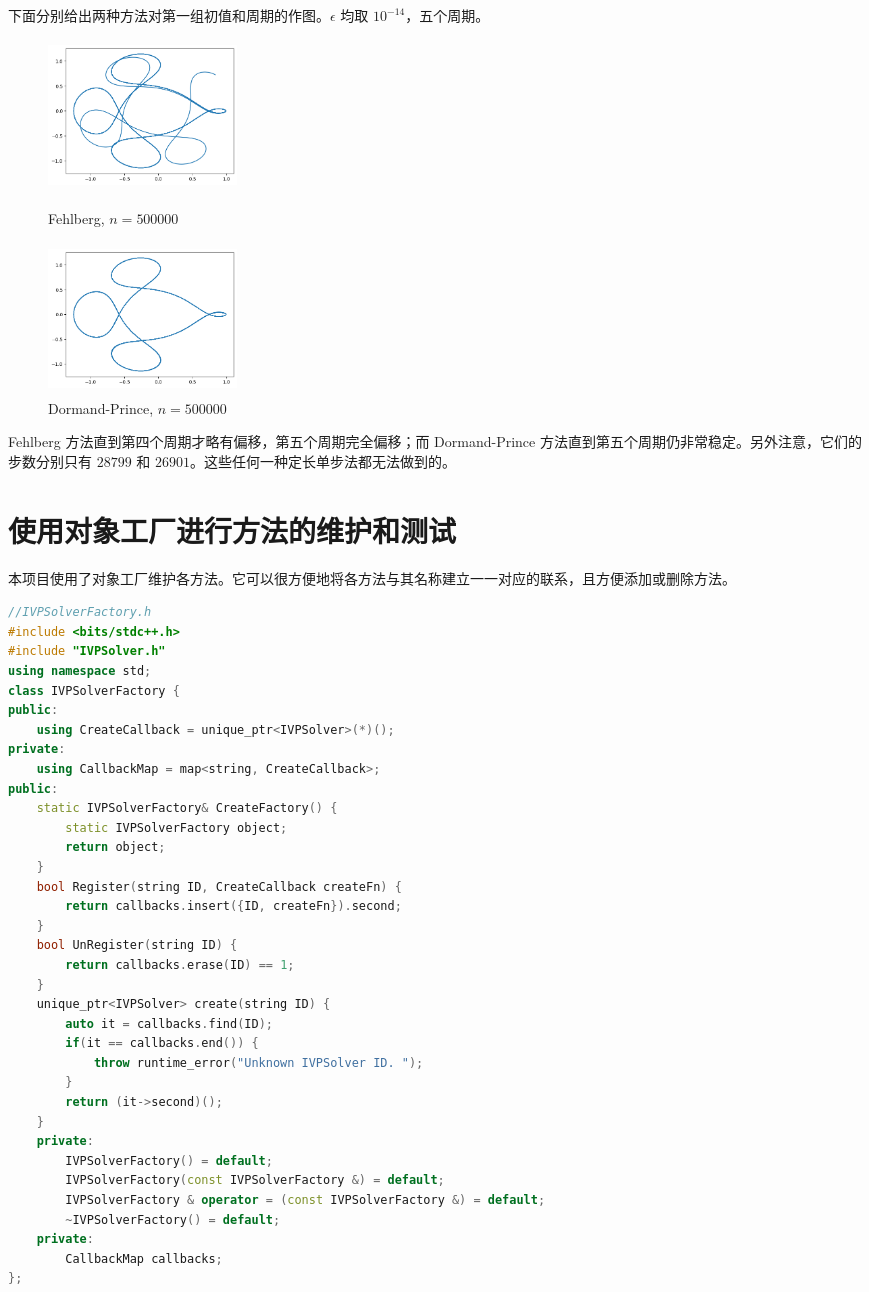 \documentclass{ctexart}
\begin{document}
下面分别给出两种方法对第一组初值和周期的作图。$\epsilon$ 均取 $10^{-14}$，五个周期。

\begin{figure}[htbp]
	\centering
	\begin{minipage}{5cm}
		\centering
		\includegraphics[width = 5cm, height = 4cm]{31.png}
		\caption{Fehlberg, $n=500000$}
		\label{31}
	\end{minipage}
	\qquad
	\begin{minipage}{5cm}
		\centering
		\includegraphics[width = 5cm, height = 4cm]{32.png}
		\caption{Dormand-Prince, $n=500000$}
		\label{32}
	\end{minipage}
\end{figure}

Fehlberg 方法直到第四个周期才略有偏移，第五个周期完全偏移；而 Dormand-Prince 方法直到第五个周期仍非常稳定。另外注意，它们的步数分别只有 $28799$ 和 $26901$。这些任何一种定长单步法都无法做到的。

\section{使用对象工厂进行方法的维护和测试}

本项目使用了对象工厂维护各方法。它可以很方便地将各方法与其名称建立一一对应的联系，且方便添加或删除方法。

\begin{lstlisting}[language=c++]
//IVPSolverFactory.h
#include <bits/stdc++.h>
#include "IVPSolver.h"
using namespace std;
class IVPSolverFactory {
public:
	using CreateCallback = unique_ptr<IVPSolver>(*)();
private:
	using CallbackMap = map<string, CreateCallback>;
public:
	static IVPSolverFactory& CreateFactory() {
		static IVPSolverFactory object;
		return object;
	}
	bool Register(string ID, CreateCallback createFn) {
		return callbacks.insert({ID, createFn}).second;
	}
	bool UnRegister(string ID) {
		return callbacks.erase(ID) == 1;
	}
	unique_ptr<IVPSolver> create(string ID) {
		auto it = callbacks.find(ID);
		if(it == callbacks.end()) {
			throw runtime_error("Unknown IVPSolver ID. ");
		}
		return (it->second)();
	}
	private:
		IVPSolverFactory() = default;
		IVPSolverFactory(const IVPSolverFactory &) = default;
		IVPSolverFactory & operator = (const IVPSolverFactory &) = default;
		~IVPSolverFactory() = default;
	private:
		CallbackMap callbacks;
};
\end{lstlisting}
\end{document}
